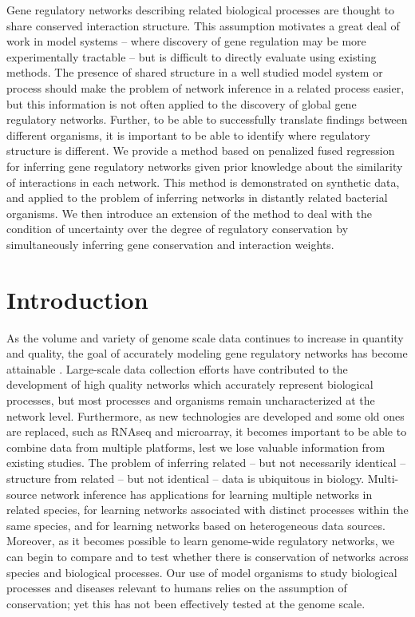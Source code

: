 \documentclass[11pt]{article}
\begin{document}
Gene regulatory networks describing related biological processes are thought to share conserved interaction structure. This assumption motivates a great deal of work in model systems – where discovery of gene regulation may be more experimentally tractable – but is difficult to directly evaluate using existing methods. The presence of shared structure in a well studied model system or process should make the problem of network inference in a related process easier, but this information is not often applied to the discovery of global gene regulatory networks. Further, to be able to successfully translate findings between different organisms, it is important to be able to identify where regulatory structure is different. We provide a method based on penalized fused regression for inferring gene regulatory networks given prior knowledge about the similarity of interactions in each network. This method is demonstrated on synthetic data, and applied to the problem of inferring networks in distantly related bacterial organisms. We then introduce an extension of the method to deal with the condition of uncertainty over the degree of regulatory conservation by simultaneously inferring gene conservation and interaction weights.


\section{Introduction}
As the volume and variety of genome scale data continues to increase in quantity and quality, the goal of accurately modeling gene regulatory networks has become attainable \cite{bonneau_predictive_2007, ciofani_validated_2012, carro_transcriptional_2010}. 
Large-scale data collection efforts have contributed to the development of high quality networks which accurately represent biological processes, but most processes and organisms remain uncharacterized at the network level. 
Furthermore, as new technologies are developed and some old ones are replaced, such as RNAseq and microarray, it becomes important to be able to combine data from multiple platforms, lest we lose valuable information from existing studies. The problem of inferring related -- but not necessarily identical -- structure from related -- but not identical -- data is ubiquitous in biology. 
Multi-source network inference has applications for learning multiple networks in related species, for learning networks associated with distinct processes within the same species, and for learning networks based on heterogeneous data sources. 
Moreover, as it becomes possible to learn genome-wide regulatory networks, we can begin to compare and to test whether there is conservation of networks across species and biological processes. 
Our use of model organisms to study biological processes and diseases relevant to humans relies on the assumption of conservation; yet this has not been effectively tested at the genome scale. 
\end{document}
